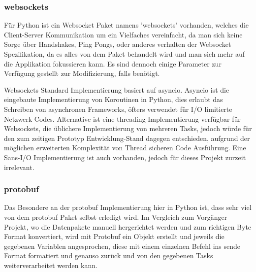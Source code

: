 \subsubsection{websockets}
Für Python ist ein Websocket Paket namens 'websockets' vorhanden, 
welches die Client-Server Kommunikation um ein Vielfaches vereinfacht, 
da man sich keine Sorge über Handshakes, Ping Pongs, 
oder anderes verhalten der Websocket Spezifikation, 
da es alles von dem Paket behandelt wird 
und man sich mehr auf die Applikation fokussieren kann. 
Es sind dennoch einige Parameter zur Verfügung gestellt zur Modifizierung, 
falls benötigt.

Websockets Standard Implementierung basiert auf asyncio.
%  
Asyncio ist die eingebaute Implementierung von Koroutinen in Python,
dies erlaubt das Schreiben von asynchronen Frameworks, 
öfters verwendet für I/O limitierte Netzwerk Codes.
Alternative ist eine threading Implementierung verfügbar für Websockets, 
die üblichere Implementierung von mehreren Tasks, 
jedoch würde für den zum zeitigen Prototyp Entwicklung-Stand dagegen entschieden,
aufgrund der möglichen erweiterten Komplexität von Thread sicheren Code Ausführung.
Eine Sans-I/O Implementierung ist auch vorhanden, 
jedoch für dieses Projekt zurzeit irrelevant.

\subsubsection{protobuf}
Das Besondere an der protobuf Implementierung hier in Python ist,
dass sehr viel von dem protobuf Paket selbst erledigt wird.
Im Vergleich zum Vorgänger Projekt, wo die Datenpakete manuell hergerichtet werden
und zum richtigen Byte Format konvertiert, wird mit Protobuf ein Objekt erstellt 
und jeweils die gegebenen Variablen angesprochen, 
diese mit einem einzelnen Befehl ins sende Format formatiert und genauso zurück
und von den gegebenen Tasks weiterverarbeitet werden kann.


